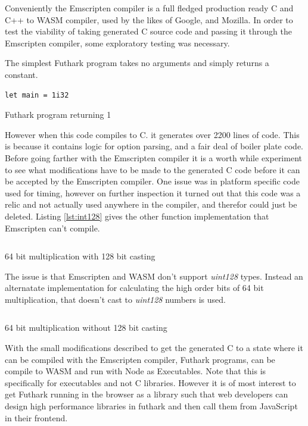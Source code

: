 \documentclass[11pt]{book}
\begin{document}
Conveniently the Emscripten compiler is a full fledged production ready C and C++ to WASM compiler, used by the likes of Google, and Mozilla. In order to test the viability of taking generated C source code and passing it through the Emscripten compiler, some exploratory testing was necessary.

The simplest Futhark program takes no arguments and simply returns a constant. 
\begin{listing}[H]
\begin{verbatim}
let main = 1i32
\end{verbatim}
\caption{Futhark program returning 1}
\label{lst:simp}
\end{listing}



However when this code compiles to C. it generates over 2200 lines of code. This is because it contains logic for option parsing, and a fair deal of boiler plate code. Before going farther with the Emscripten compiler it is a worth while experiment to see what modifications have to be made to the generated C code before it can be accepted by the Emscripten compiler. One issue was in platform specific code used for timing, however on further inspection it turned out that this code was a relic and not actually used anywhere in the compiler, and therefor could just be deleted. Listing \ref{lst:int128} gives the other function implementation that Emscripten can't compile.
\begin{listing}[H] 
        \inputminted[fontsize=\small,baselinestretch=0.5,linenos]{C}{code/compiler/int128_c.c}
        \caption{64 bit multiplication with 128 bit casting}
        \label{lst:int128}    
\end{listing} 

The issue is that Emscripten and WASM don't support \textit{uint128} types. Instead an alternatate implementation for calculating the high order bits of 64 bit multiplication, that doesn't cast to \textit{uint128} numbers is used. 

\begin{listing}[H] 
        \inputminted[fontsize=\small,baselinestretch=0.5,linenos]{C}{code/compiler/int128_wasm.c}
        \caption{64 bit multiplication without 128 bit casting}
        \label{lst:integrate-js}    
\end{listing} 


With the small modifications described to get the generated C to a state where it can be compiled with the Emscripten compiler, Futhark programs, can be compile to WASM and run with Node as Executables. Note that this is specifically for executables and not C libraries. However it is of most interest to get Futhark running in the browser as a library such that web developers can design high performance libraries in futhark and then call them from JavaScript in their frontend. 
\end{document}
